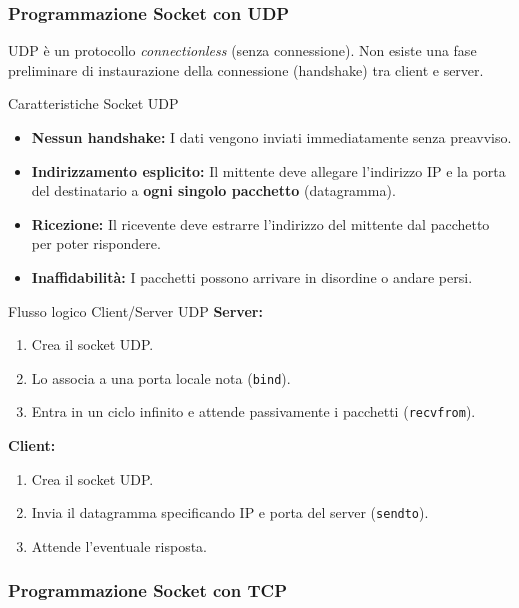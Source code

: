 \documentclass[a4paper,12pt]{report}
\begin{document}
\subsubsection{Programmazione Socket con UDP}

UDP è un protocollo \textit{connectionless} (senza connessione). Non esiste una fase preliminare di instaurazione della connessione (handshake) tra client e server.

\begin{defbox}{Caratteristiche Socket UDP}
\begin{itemize}
    \item \textbf{Nessun handshake:} I dati vengono inviati immediatamente senza preavviso.
    \item \textbf{Indirizzamento esplicito:} Il mittente deve allegare l'indirizzo IP e la porta del destinatario a \textbf{ogni singolo pacchetto} (datagramma).
    \item \textbf{Ricezione:} Il ricevente deve estrarre l'indirizzo del mittente dal pacchetto per poter rispondere.
    \item \textbf{Inaffidabilità:} I pacchetti possono arrivare in disordine o andare persi.
\end{itemize}
\end{defbox}

\begin{esempiobox}{Flusso logico Client/Server UDP}
\textbf{Server:}
\begin{enumerate}
    \item Crea il socket UDP.
    \item Lo associa a una porta locale nota (\texttt{bind}).
    \item Entra in un ciclo infinito e attende passivamente i pacchetti (\texttt{recvfrom}).
\end{enumerate}
\textbf{Client:}
\begin{enumerate}
    \item Crea il socket UDP.
    \item Invia il datagramma specificando IP e porta del server (\texttt{sendto}).
    \item Attende l'eventuale risposta.
\end{enumerate}
\end{esempiobox}

\newpage
\subsubsection{Programmazione Socket con TCP}
\end{document}
